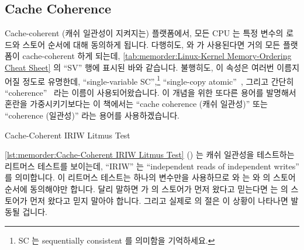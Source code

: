 \subsection{Cache Coherence}
\label{sec:memorder:Cache Coherence}

Cache-coherent (캐쉬 일관성이 지켜지는) 플랫폼에서, 모든 CPU 는 특정 변수의
로드와 스토어 순서에 대해 동의하게 됩니다.
다행히도,  와  가 사용된다면 거의 모든
플랫폼이 cache-coherent 하게 되는데,
\cref{tab:memorder:Linux-Kernel Memory-Ordering Cheat Sheet}
의 ``SV'' 행에 표시된 바와 같습니다.
불행히도, 이 속성은 여러번 이름지어질 정도로 유명한데, ``single-variable
SC'',\footnote{
	SC 는 sequentially consistent 를 의미함을 기억하세요.}
``single-copy atomic''~\cite{Stone:1995:SP:623262.623912},
그리고 간단히 ``coherence''~\cite{JadeAlglave2011ppcmem} 라는 이름이
사용되어왔습니다.
이 개념을 위한 또다른 용어를 발명해서 혼란을 가중시키기보다는 이 책에서는
``cache coherence (캐쉬 일관성)'' 또는 ``coherence (일관성)'' 라는 용어를
사용하겠습니다.

\begin{listing}[tbp]

\caption{Cache-Coherent IRIW Litmus Test}
\label{lst:memorder:Cache-Coherent IRIW Litmus Test}
\end{listing}

\begin{fcvref}
\cref{lst:memorder:Cache-Coherent IRIW Litmus Test}
()
는 캐쉬 일관성을 테스트하는 리트머스 테스트를 보이는데, ``IRIW'' 는
``independent reads of independent writes'' 를 의미합니다.
이 리트머스 테스트는 하나의 변수만을 사용하므로  와  는
 와  의 스토어 순서에 동의해야만 합니다.
달리 말하면  가  의 스토어가 먼저 왔다고 믿는다면 
는  의 스토어가 먼저 왔다고 믿지 말아야 합니다.
그리고 실제로  의  절은 이 상황이 나타나면 발동될
겁니다.
\end{fcvref}

